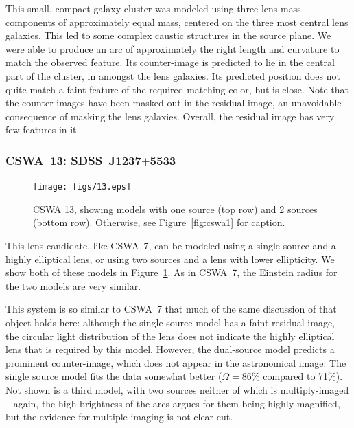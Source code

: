 \documentclass[iop]{emulateapj}
\begin{document}
This small, compact galaxy cluster was modeled using three lens mass components
of approximately equal mass, centered on the three most central lens galaxies.
This led to some complex caustic structures in the source plane. We were able to
produce an arc of approximately the right length and curvature to match the
observed feature. Its counter-image is predicted to lie in the central part of
the cluster, in amongst the lens galaxies. Its predicted position does not quite
match a faint feature of the required matching color, but is close.  Note that
the counter-images have been masked out in the residual image, an unavoidable
consequence of masking the lens galaxies. Overall, the residual image has very
few features in it.



\subsubsection*{CSWA~13: SDSS\ J1237$+$5533}
\label{sec:results:indinotes:cswa13}


\begin{figure}[!ht]
	\centering\texttt{[image: figs/13.eps]}
  \caption{CSWA 13, showing models with one source (top row) and 2 sources
  (bottom row). Otherwise, see Figure~\ref{fig:cswa1} for caption.}
  \label{fig:cswa13}
\end{figure}

This lens candidate, like CSWA~7, can be modeled using a single source and a
highly elliptical lens, or using two sources and a lens with lower ellipticity.
We show both of these models in Figure~\ref{fig:cswa13}. As in CSWA~7, the
Einstein radius for the two models are very similar.

This system is so similar to CSWA~7 that much of the same discussion of that
object holds here: although the single-source model has a faint residual image,
the circular light distribution of the lens does not indicate the highly
elliptical lens that is required by this model. However, the dual-source model
predicts a prominent counter-image, which does not appear in the astronomical
image. The single source model fits the data somewhat better ($\Omega = 86\%$
compared to 71\%). Not shown is a third model, with two sources neither of which
is multiply-imaged -- again, the high brightness of the arcs argues for them
being highly magnified, but the evidence for multiple-imaging is not clear-cut. 
\end{document}
